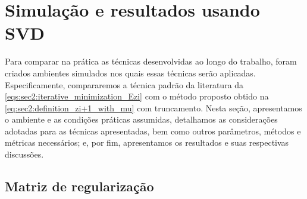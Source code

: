 \section{Simulação e resultados usando SVD}
\label{sec:simulation_and_results}
\def\sympath{h386f}


Para comparar na prática as técnicas desenvolvidas ao longo do trabalho, foram criados ambientes simulados nos quais essas técnicas serão aplicadas. Especificamente, compararemos a técnica padrão da literatura da \cref{eqs:sec2:iterative_minimization_Ezi} com o método proposto obtido na \cref{eq:sec2:definition_zi+1_with_mu} com truncamento. Nesta seção, apresentamos o ambiente e as condições práticas assumidas, detalhamos as considerações adotadas para as técnicas apresentadas, bem como outros parâmetros, métodos e métricas necessários; e, por fim, apresentamos os resultados e suas respectivas discussões.

\subsection{Matriz de regularização}

